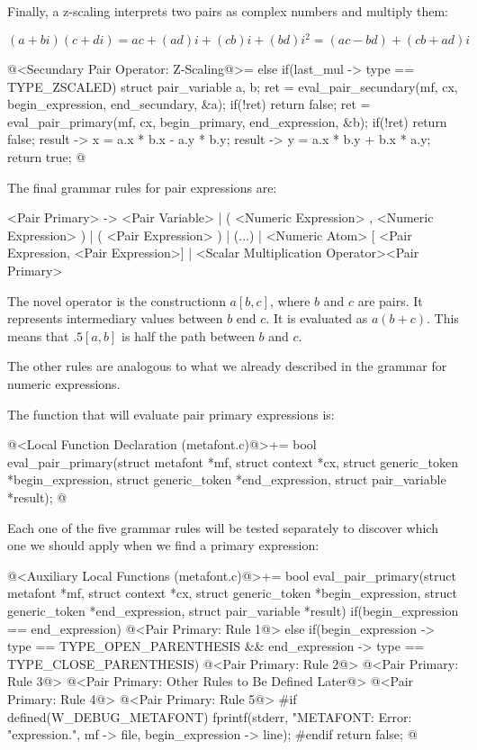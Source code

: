 Finally, a z-scaling interprets two pairs as complex numbers and
multiply them:

$$
(a+bi)(c+di) = ac + (ad)i + (cb)i + (bd)i^2 = (ac - bd) + (cb+ad)i
$$

\iniciocodigo
@<Secundary Pair Operator: Z-Scaling@>=
else if(last_mul -> type == TYPE_ZSCALED){
  struct pair_variable a, b;
  ret = eval_pair_secundary(mf, cx, begin_expression, end_secundary, &a);
  if(!ret)
    return false;
  ret = eval_pair_primary(mf, cx, begin_primary, end_expression, &b);
  if(!ret)
    return false;
  result -> x = a.x * b.x - a.y * b.y;
  result -> y = a.x * b.y + b.x * a.y;
  return true;
}
@
\fimcodigo


The final grammar rules for pair expressions are:

\alinhaverbatim
<Pair Primary> -> <Pair Variable> |
                  ( <Numeric Expression> , <Numeric Expression> ) |
                  ( <Pair Expression> ) |
                  (...) |
                  <Numeric Atom> [ <Pair Expression, <Pair Expression>] |
                  <Scalar Multiplication Operator><Pair Primary>
\alinhanormal

The novel operator is the constructionn $a[b, c]$, where $b$ and $c$
are pairs. It represents intermediary values between $b$ end $c$. It
is evaluated as $a(b+c)$. This means that $.5[a,b]$ is half the path
between $b$ and $c$.

The other rules are analogous to what we already described in the
grammar for numeric expressions.

The function that will evaluate pair primary expressions is:

\iniciocodigo
@<Local Function Declaration (metafont.c)@>+=
bool eval_pair_primary(struct metafont *mf, struct context *cx,
                       struct generic_token *begin_expression,
                       struct generic_token *end_expression,
                       struct pair_variable *result);
@
\fimcodigo

Each one of the five grammar rules will be tested separately to
discover which one we should apply when we find a primary expression:

\iniciocodigo
@<Auxiliary Local Functions (metafont.c)@>+=
bool eval_pair_primary(struct metafont *mf, struct context *cx,
                       struct generic_token *begin_expression,
                       struct generic_token *end_expression,
                       struct pair_variable *result){
  if(begin_expression == end_expression){
    @<Pair Primary: Rule 1@>
  }
  else if(begin_expression -> type == TYPE_OPEN_PARENTHESIS &&
          end_expression -> type == TYPE_CLOSE_PARENTHESIS){
    @<Pair Primary: Rule 2@>
    @<Pair Primary: Rule 3@>
  }
  @<Pair Primary: Other Rules to Be Defined Later@>
  @<Pair Primary: Rule 4@>
  @<Pair Primary: Rule 5@>
#if defined(W_DEBUG_METAFONT)
  fprintf(stderr, "METAFONT: Error: %
          "expression.",  mf -> file, begin_expression -> line);
#endif
  return false;
}
@


